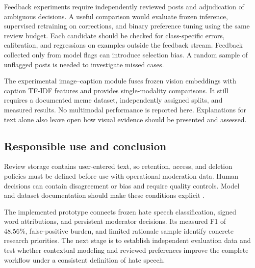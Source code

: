\documentclass[11pt,a4paper]{article}
\begin{document}
Feedback experiments require independently reviewed posts and adjudication of
ambiguous decisions. A useful comparison would evaluate frozen inference,
supervised retraining on corrections, and binary preference tuning using the
same review budget. Each candidate should be checked for class-specific errors,
calibration, and regressions on examples outside the feedback stream. Feedback
collected only from model flags can introduce selection bias. A random sample
of unflagged posts is needed to investigate missed cases.

The experimental image--caption module fuses frozen vision embeddings with
caption TF-IDF features and provides single-modality comparisons. It still
requires a documented meme dataset, independently assigned splits, and measured
results. No multimodal performance is reported here. Explanations for text
alone also leave open how visual evidence should be presented and assessed.

\subsection{Responsible use and conclusion}
Review storage contains user-entered text, so retention, access, and deletion
policies must be defined before use with operational moderation data. Human
decisions can contain disagreement or bias and require quality controls.
Model and dataset documentation should make these conditions explicit
\cite{modelcards,datasheets}.

The implemented prototype connects frozen hate speech classification, signed
word attributions, and persistent moderator decisions. Its measured F1 of
48.56\%, false-positive burden, and limited rationale sample identify concrete
research priorities. The next stage is to establish independent evaluation
data and test whether contextual modeling and reviewed preferences improve
the complete workflow under a consistent definition of hate speech.
\end{document}
